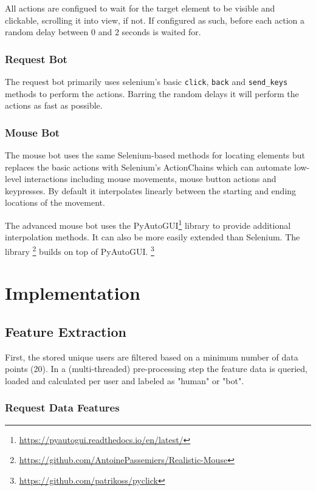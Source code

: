 \documentclass[
    fontsize=12pt,
    headings=small,
    parskip=half,           %
    bibliography=totoc,
    numbers=noenddot,       %
    open=any,               %
    final                   %
]{scrreprt}
\begin{document}
All actions are configued to wait for the target element to be visible and clickable, scrolling it into view, if not. If configured as such, before each action a random delay between $0$ and $2$ seconds is waited for.

\subsection{Request Bot}

The request bot primarily uses selenium's basic \lstinline{click}, \lstinline{back} and \lstinline{send_keys} methods to perform the actions. Barring the random delays it will perform the actions as fast as possible.

\subsection{Mouse Bot}

The mouse bot uses the same Selenium-based methods for locating elements but replaces the basic actions with Selenium's ActionChains which can automate low-level interactions including mouse movements, mouse button actions and keypresses. By default it interpolates linearly between the starting and ending locations of the movement.

The advanced mouse bot uses the PyAutoGUI\footnote{\url{https://pyautogui.readthedocs.io/en/latest/}} library to provide additional interpolation methods. It can also be more easily extended than Selenium.
The library \footnote{\url{https://github.com/AntoinePassemiers/Realistic-Mouse}} builds on top of PyAutoGUI.
\footnote{\url{https://github.com/patrikoss/pyclick}}


\chapter{Implementation}


\section{Feature Extraction}

First, the stored unique users are filtered based on a minimum number of data points (20). In a (multi-threaded) pre-processing step the feature data is queried, loaded and calculated per user and labeled as "human" or "bot".

\subsection{Request Data Features}
\end{document}
